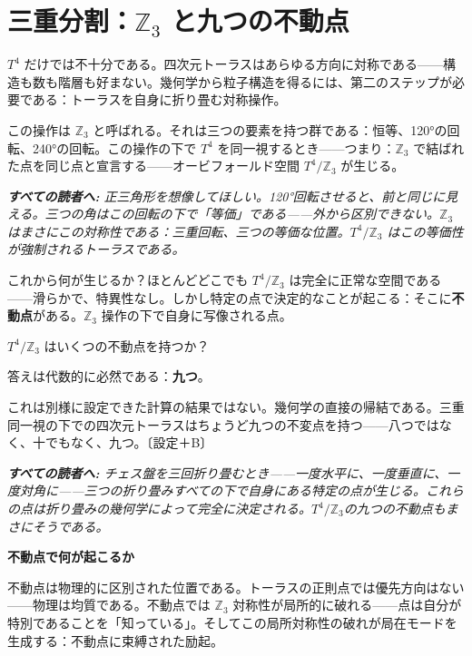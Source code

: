 \documentclass[11pt,openany]{book}
\newenvironment{laierspur}{%
  \par\vspace{4pt}%
  \noindent\small\itshape\color{blue!60!black}%
  \textbf{すべての読者へ:}\enspace\ignorespaces}{%
  \par\vspace{4pt}\normalsize\normalfont\normalcolor}
\begin{document}
\medskip

\chapter{三重分割：$\mathbb{Z}_3$ と九つの不動点}

$T^4$ だけでは不十分である。四次元トーラスはあらゆる方向に対称である——構造も数も階層も好まない。幾何学から粒子構造を得るには、第二のステップが必要である：トーラスを自身に折り畳む対称操作。

この操作は $\mathbb{Z}_3$ と呼ばれる。それは三つの要素を持つ群である：恒等、120°の回転、240°の回転。この操作の下で $T^4$ を同一視するとき——つまり：$\mathbb{Z}_3$ で結ばれた点を同じ点と宣言する——オービフォールド空間 $T^4/\mathbb{Z}_3$ が生じる。

\begin{laierspur}
正三角形を想像してほしい。120°回転させると、前と同じに見える。三つの角はこの回転の下で「等価」である——外から区別できない。$\mathbb{Z}_3$ はまさにこの対称性である：三重回転、三つの等価な位置。$T^4/\mathbb{Z}_3$ はこの等価性が強制されるトーラスである。
\end{laierspur}

これから何が生じるか？ほとんどどこでも $T^4/\mathbb{Z}_3$ は完全に正常な空間である——滑らかで、特異性なし。しかし特定の点で決定的なことが起こる：そこに\textbf{不動点}がある。$\mathbb{Z}_3$ 操作の下で自身に写像される点。

$T^4/\mathbb{Z}_3$ はいくつの不動点を持つか？

答えは代数的に必然である：\textbf{九つ}。

これは別様に設定できた計算の結果ではない。幾何学の直接の帰結である。三重同一視の下での四次元トーラスはちょうど九つの不変点を持つ——八つではなく、十でもなく、九つ。〔設定＋B〕

\begin{laierspur}
チェス盤を三回折り畳むとき——一度水平に、一度垂直に、一度対角に——三つの折り畳みすべての下で自身にある特定の点が生じる。これらの点は折り畳みの幾何学によって完全に決定される。$T^4/\mathbb{Z}_3$の九つの不動点もまさにそうである。
\end{laierspur}

\textbf{不動点で何が起こるか}

不動点は物理的に区別された位置である。トーラスの正則点では優先方向はない——物理は均質である。不動点では $\mathbb{Z}_3$ 対称性が局所的に破れる——点は自分が特別であることを「知っている」。そしてこの局所対称性の破れが局在モードを生成する：不動点に束縛された励起。
\end{document}
